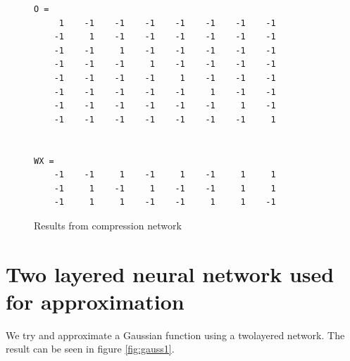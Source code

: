 \documentclass[a4paper,11pt]{article}
\begin{document}
\begin{figure}[h!]
\begin{lstlisting}
O =
     1    -1    -1    -1    -1    -1    -1    -1
    -1     1    -1    -1    -1    -1    -1    -1
    -1    -1     1    -1    -1    -1    -1    -1
    -1    -1    -1     1    -1    -1    -1    -1
    -1    -1    -1    -1     1    -1    -1    -1
    -1    -1    -1    -1    -1     1    -1    -1
    -1    -1    -1    -1    -1    -1     1    -1
    -1    -1    -1    -1    -1    -1    -1     1


WX =
    -1    -1     1    -1     1    -1     1     1
    -1     1    -1     1    -1    -1     1     1
    -1     1     1    -1    -1     1     1    -1
\end{lstlisting}
\label{fig:compress2}
\caption{Results from compression network}
\end{figure}

\clearpage
\section{Two layered neural network used for approximation}
We try and approximate a Gaussian function using a twolayered network. The result can be seen in figure \ref{fig:gauss1}.
\end{document}
